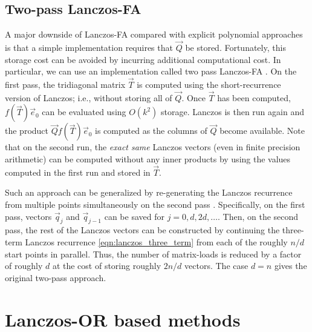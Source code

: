 \subsection{Two-pass Lanczos-FA}

A major downside of Lanczos-FA compared with explicit polynomial approaches is that a simple implementation requires that \( \vec{Q} \) be stored.
Fortunately, this storage cost can be avoided by incurring additional computational cost. 
In particular, we can use an implementation called two pass Lanczos-FA \cite{boricci_00a,frommer_simoncini_08}.
On the first pass, the tridiagonal matrix $\vec{T}$ is computed using the short-recurrence version of Lanczos; i.e., without storing all of $\vec{Q}$.
Once $\vec{T}$ has been computed, $f(\vec{T}) \vec{e}_0$ can be evaluated using $O(k^2)$ storage.
Lanczos is then run again and the product $\vec{Q} f(\vec{T}) \vec{e}_0$ is computed as the columns of $\vec{Q}$ become available.
Note that on the second run, the \emph{exact same} Lanczos vectors (even in finite precision arithmetic) can be computed without any inner products by using the values computed in the first run and stored in \( \vec{T} \).


Such an approach can be generalized by re-generating the Lanczos recurrence from multiple points simultaneously on the second pass \cite{li_22}.
Specifically, on the first pass, vectors \( \vec{q}_j \) and \( \vec{q}_{j-1} \) can be saved for \( j=0,d,2d,\ldots \). 
Then, on the second pass, the rest of the Lanczos vectors can be constructed by continuing the three-term Lanczos recurrence \cref{eqn:lanczos_three_term} from each of the roughly \( n/d \) start points in parallel. 
Thus, the number of matrix-loads is reduced by a factor of roughly \( d \) at the cost of storing roughly \( 2n/d \) vectors.
The case \( d=n \) gives the original two-pass approach.

\section{Lanczos-OR based methods}
\label{sec:lanczos_OR_gen}

